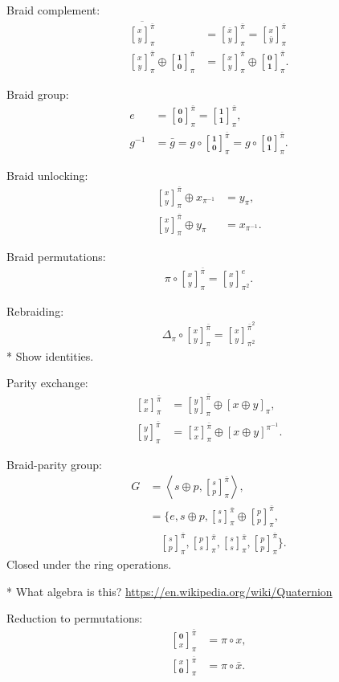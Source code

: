\documentclass[twocolumn, aps, amsmath, amssymb, nofootinbib, superscriptaddress, longbibliography, doublefloatfix, table-of-contents, eqsecnum, rmp]{revtex4-2}
\def\zerovec{\mathbf{0}}
\def\onevec{\mathbf{1}}
\newcommand{\stackbraid}[2]{{\genfrac{[}{]}{0pt}{}{{#1}}{{#2}}}^{\bar{\pi}}_{\pi}}
\newcommand{\stackbraidpow}[3]{{\genfrac{[}{]}{0pt}{}{{#1}}{{#2}}}^{\bar{\pi}^{#3}}_{\pi^#3}}
\newcommand{\stackbraidgen}[4]{{\genfrac{[}{]}{0pt}{}{{#1}}{{#2}}}^{#3}_{#4}}
\begin{document}
Braid complement:
\begin{align}
	\overline{\stackbraid{x}{y}} &= \stackbraid{\bar{x}}{y} = \stackbraid{x}{\bar{y}} \nonumber\\
\stackbraid{x}{y} \oplus \stackbraid{\onevec}{\zerovec} &= \stackbraid{x}{y} \oplus \stackbraid{\zerovec}{\onevec}.
\end{align}

Braid group:
\begin{align}
	e &= \stackbraid{\zerovec}{\zerovec} = \stackbraid{\onevec}{\onevec},\nonumber\\
	g^{-1} &= \bar{g} = g\circ \stackbraid{\onevec}{\zerovec} = g\circ \stackbraid{\zerovec}{\onevec}.
\end{align}

Braid unlocking:
\begin{align}
	\stackbraid{x}{y} \oplus x_{\pi^{-1}} &= y_\pi,\nonumber\\
	\stackbraid{x}{y} \oplus y_{\pi} &= x_{\pi^{-1}}.
\end{align}

Braid permutations:
\begin{align}
	\pi \circ \stackbraid{x}{y} = \stackbraidgen{x}{y}{e}{\pi^2}.
\end{align}

Rebraiding:
\begin{align}
	\Delta_\pi \circ \stackbraid{x}{y} = \stackbraidpow{x}{y}{2}
\end{align}
* Show identities.

Parity exchange:
\begin{align}
	\stackbraid{x}{x} &= \stackbraid{y}{y} \oplus [x\oplus y]_\pi,\nonumber\\
	\stackbraid{y}{y} &= \stackbraid{x}{x} \oplus [x\oplus y]^{\pi^{-1}}.
\end{align}

Braid-parity group:
\begin{align}
	G &= \left\langle s\oplus p, \stackbraid{s}{p} \right\rangle,\nonumber\\
	&= \{e, s\oplus p, \stackbraid{s}{s} \oplus \stackbraid{p}{p},\nonumber\\
	&\quad \stackbraid{s}{p}, \stackbraid{p}{s}, \stackbraid{s}{s}, \stackbraid{p}{p} \}.
\end{align}
Closed under the ring operations.

* What algebra is this? \url{https://en.wikipedia.org/wiki/Quaternion}

Reduction to permutations:
\begin{align}
	\stackbraid{\zerovec}{x} &= \pi \circ x,\nonumber\\
	\stackbraid{x}{\zerovec} &= \pi \circ \bar{x}.
\end{align}
\end{document}
